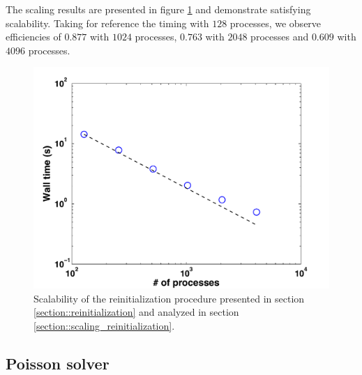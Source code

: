 The scaling results are presented in figure \ref{fig::scaling_reinitialization} and demonstrate satisfying scalability. Taking for reference the timing with $128$ processes, we observe efficiencies of $0.877$ with $1024$ processes, $0.763$ with $2048$ processes and $0.609$ with $4096$ processes.

\begin{figure}[ht!]
\begin{center}
\includegraphics[width=.7\textwidth]{pictures/scaling_reinitialization_1st_time_2nd_space_with_buffer.pdf}
\caption{Scalability of the reinitialization procedure presented in section \ref{section::reinitialization} and analyzed in section \ref{section::scaling_reinitialization}.} \label{fig::scaling_reinitialization}
\end{center}
\end{figure}

\subsection{Poisson solver}